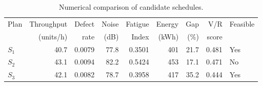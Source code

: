 \begin{table}[htbp]
\centering
\caption{Numerical comparison of candidate schedules.}
\label{tab:numerical-sim}
\small
\begin{tabular}{@{}lrrrrrrrl@{}}
\toprule
Plan & Throughput & Defect & Noise & Fatigue & Energy & Gap & V/R & Feasible \\
     & (units/h)  & rate   & (dB)  & Index   & (kWh)  & (\%) & score &         \\
\midrule
$S_{1}$ & 40.7 & 0.0079 & 77.8 & 0.3501 & 401 & 21.7 & 0.481 & Yes \\
$S_{2}$ & 43.1 & 0.0094 & 82.2 & 0.5424 & 453 & 17.1 & 0.471 & No \\
$S_{3}$ & 42.1 & 0.0082 & 78.7 & 0.3958 & 417 & 35.2 & 0.444 & Yes \\
\bottomrule
\end{tabular}
\end{table}
